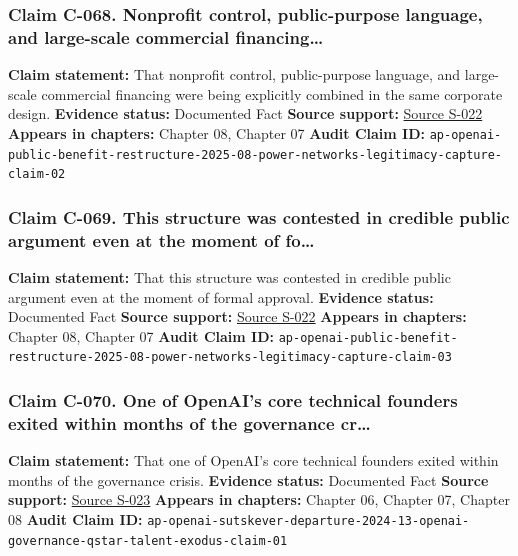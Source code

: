 \documentclass[
  american,
  11pt,
  letterpaper,
]{article}
\begin{document}
\subsubsection{Claim C-068. Nonprofit control, public-purpose language,
and large-scale commercial
financing\ldots{}}\label{claim-c-068-nonprofit-control-public-purpose-language-and-large-scale-commercial-financing}

\textbf{Claim statement:} That nonprofit control, public-purpose
language, and large-scale commercial financing were being explicitly
combined in the same corporate design. \textbf{Evidence status:}
Documented Fact \textbf{Source support:}
\hyperref[source-s-022-openai-may-move-forward-with-new-business-structure-partnership-with-microsoft-regulators-say]{Source
S-022} \textbf{Appears in chapters:} Chapter 08, Chapter 07
\textbf{Audit Claim ID:}
\texttt{ap-openai-public-benefit-restructure-2025-08-power-networks-legitimacy-capture-claim-02}

\subsubsection{Claim C-069. This structure was contested in credible
public argument even at the moment of
fo\ldots{}}\label{claim-c-069-this-structure-was-contested-in-credible-public-argument-even-at-the-moment-of-fo}

\textbf{Claim statement:} That this structure was contested in credible
public argument even at the moment of formal approval. \textbf{Evidence
status:} Documented Fact \textbf{Source support:}
\hyperref[source-s-022-openai-may-move-forward-with-new-business-structure-partnership-with-microsoft-regulators-say]{Source
S-022} \textbf{Appears in chapters:} Chapter 08, Chapter 07
\textbf{Audit Claim ID:}
\texttt{ap-openai-public-benefit-restructure-2025-08-power-networks-legitimacy-capture-claim-03}

\subsubsection{Claim C-070. One of OpenAI's core technical founders
exited within months of the governance
cr\ldots{}}\label{claim-c-070-one-of-openai-s-core-technical-founders-exited-within-months-of-the-governance-cr}

\textbf{Claim statement:} That one of OpenAI's core technical founders
exited within months of the governance crisis. \textbf{Evidence status:}
Documented Fact \textbf{Source support:}
\hyperref[source-s-023-openai-co-founder-ilya-sutskever-announces-departure-from-chatgpt-maker]{Source
S-023} \textbf{Appears in chapters:} Chapter 06, Chapter 07, Chapter 08
\textbf{Audit Claim ID:}
\texttt{ap-openai-sutskever-departure-2024-13-openai-governance-qstar-talent-exodus-claim-01}
\end{document}
